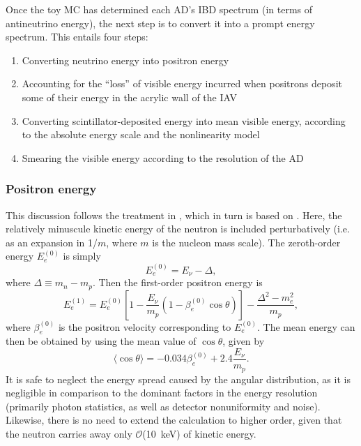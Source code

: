 \documentclass[../thesis.tex]{subfiles}
\begin{document}
Once the toy MC has determined each AD's IBD spectrum (in terms of antineutrino energy), the next step is to convert it into a prompt energy spectrum. This entails four steps:

\begin{enumerate}
\item Converting neutrino energy into positron energy
\item Accounting for the ``loss'' of visible energy incurred when positrons deposit some of their energy in the acrylic wall of the IAV
\item Converting scintillator-deposited energy into mean visible energy, according to the absolute energy scale and the nonlinearity model
\item Smearing the visible energy according to the resolution of the AD
\end{enumerate}

\subsubsection{Positron energy}

This discussion follows the treatment in \cite{berkeley_toymc}, which in turn is based on \cite{Vogel_1999}. Here, the relatively minuscule kinetic energy of the neutron is included perturbatively (i.e. as an expansion in 1/$m$, where $m$ is the nucleon mass scale). The zeroth-order energy $E_e^{(0)}$ is simply
\begin{equation}
  E_e^{(0)} = E_\nu - \Delta,
\end{equation}
where $\Delta \equiv m_n - m_p$. Then the first-order positron energy is
\begin{equation}
  E_e^{(1)} = E_e^{(0)} \left[ 1 - \frac{E_\nu}{m_p}(1 - \beta_e^{(0)}\cos\theta) \right]
  - \frac{\Delta^2 - m_e^2}{m_p},
\end{equation}
where $\beta_e^{(0)}$ is the positron velocity corresponding to $E_e^{(0)}$. The mean energy can then be obtained by using the mean value of $\cos \theta$, given by \cite{Vogel_1999}
\begin{equation}
  \langle \cos \theta \rangle = -0.034 \beta_e^{(0)} + 2.4 \frac{E_\nu}{m_p}.
\end{equation}
It is safe to neglect the energy spread caused by the angular distribution, as it is negligible in comparison to the dominant factors in the energy resolution (primarily photon statistics, as well as detector nonuniformity and noise). Likewise, there is no need to extend the calculation to higher order, given that the neutron carries away only $\mathcal{O}$(10~keV) of kinetic energy.
\end{document}
